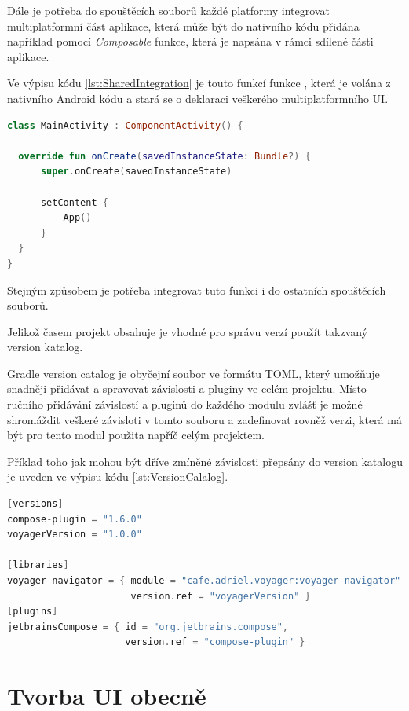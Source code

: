 Dále je potřeba do spouštěcích souborů každé platformy integrovat multiplatformní část aplikace, která může být do nativního kódu přidána
například pomocí \textit{Composable} funkce, která je napsána v rámci sdílené části aplikace.

Ve výpisu kódu \ref{lst:SharedIntegration} je touto funkcí funkce , která je volána z nativního Android kódu a stará se
o deklaraci veškerého multiplatformního UI.

\begin{lstlisting}[caption={Lib integration}, label={lst:SharedIntegration}, language=Kotlin]
class MainActivity : ComponentActivity() {

  override fun onCreate(savedInstanceState: Bundle?) {
      super.onCreate(savedInstanceState)

      setContent {
          App()
      }
  }
}
\end{lstlisting}

Stejným způsobem je potřeba integrovat tuto funkci i do ostatních spouštěcích souborů. 



Jelikož časem projekt obsahuje je vhodné pro správu verzí použít takzvaný version katalog. 

Gradle version catalog je obyčejní soubor ve formátu TOML, který umožňuje snadněji přidávat a spravovat závislosti a pluginy ve celém projektu. 
Místo ručního přidávání závislostí a pluginů do každého modulu zvlášť je možné shromáždit veškeré závisloti v tomto souboru a zadefinovat rovněž
verzi, která má být pro tento modul použita napříč celým projektem. 

Příklad toho jak mohou být dříve zmíněné závislosti přepsány do version
katalogu je uveden ve výpisu kódu \ref{lst:VersionCalalog}.

\begin{lstlisting}[caption={Version katalog}, label={lst:VersionCalalog}, language=Kotlin]
[versions]
compose-plugin = "1.6.0"
voyagerVersion = "1.0.0"

[libraries]
voyager-navigator = { module = "cafe.adriel.voyager:voyager-navigator", 
                      version.ref = "voyagerVersion" }
[plugins]
jetbrainsCompose = { id = "org.jetbrains.compose",
                     version.ref = "compose-plugin" }

\end{lstlisting}

\section{Tvorba UI obecně}
